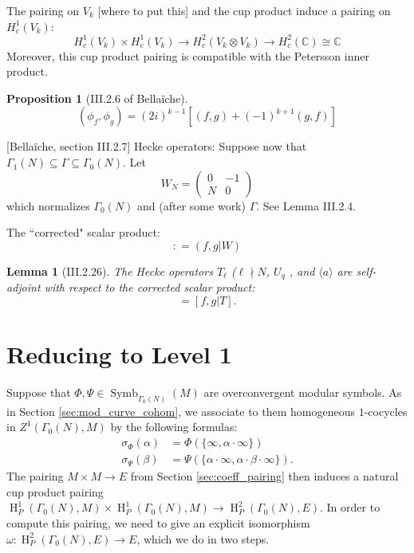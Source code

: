\documentclass[10pt]{amsart}
\theoremstyle{plain}
\newtheorem{proposition}[theorem]{Proposition}
\newtheorem{lemma}[theorem]{Lemma}
\theoremstyle{definition}
\newcommand{\CC}{{\mathbb{C}}}
\DeclareMathOperator{\Symb}{Symb}
\DeclareMathOperator{\Hh}{H}
\begin{document}
The pairing on $V_k$ [where to put this] and the cup product induce a pairing on $H^1_c(V_k)$:
\begin{equation*}
	H^1_c(V_k)\times H^1_c(V_k) \longrightarrow H^2_c(V_k\otimes V_k)\longrightarrow H^2_c(\CC)\cong \CC
\end{equation*}
Moreover, this cup product pairing is compatible with the Petersson inner product.
\begin{proposition}[III.2.6 of Bella\"iche]
\begin{equation*}
	(\phi_f,\phi_g ) = (2i)^{k-1}[(f,g) + (-1)^{k+1} (g,f)]
\end{equation*}
\end{proposition}


[Bella\"iche, section III.2.7]
Hecke operators: Suppose now that $\Gamma_1(N)\subseteq \Gamma \subseteq \Gamma_0(N)$. Let 
\begin{equation}
	W_N = \begin{pmatrix} 0 & -1 \\ N & 0\end{pmatrix}
\end{equation}
which normalizes $\Gamma_0(N)$ and (after some work) $\Gamma$. See Lemma III.2.4.

The ``corrected" scalar product:
\begin{equation*}
	[f,g] : =(f,g|W)
\end{equation*}

\begin{lemma}[III.2.26]
The Hecke operators $T_\ell$ ($\ell\nmid N$, $U_q$ , and $\langle a \rangle$ are self-adjoint with respect to the corrected scalar product:
\begin{equation*}
	[f|T,g]=[f,g|T].
\end{equation*}	
\end{lemma}







\section{Reducing to Level 1} \label{sec:level_one}

Suppose that $\Phi, \Psi \in \Symb_{\Gamma_0(N)}(M)$ are overconvergent modular symbols.  As in Section \ref{sec:mod_curve_cohom}, we associate to them homogeneous $1$-cocycles in $Z^1(\Gamma_0(N), M)$ by the following formulas:
\begin{align*}
\sigma_{\Phi}(\alpha) &= \Phi(\{\infty, \alpha \cdot \infty\}) \\
\sigma_{\Psi}(\beta) &= \Psi(\{\alpha \cdot \infty, \alpha \cdot \beta \cdot \infty\}).
\end{align*}
The pairing $M \times M \to E$ from Section \ref{sec:coeff_pairing} then induces a natural cup product pairing $\Hh^1_P(\Gamma_0(N), M) \times \Hh^1_P(\Gamma_0(N), M) \to \Hh^2_P(\Gamma_0(N), E)$.  In order to compute this pairing, we need to give an explicit isomorphism $\omega : \Hh^2_P(\Gamma_0(N), E) \to E$, which we do in two steps.
\end{document}
